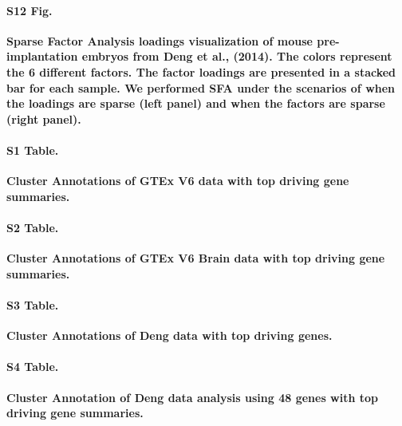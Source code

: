 \documentclass[10pt,letterpaper]{article}
\begin{document}
\paragraph*{S12 Fig.}
\label{figS12}
\bf{Sparse Factor Analysis loadings visualization of mouse pre-implantation
embryos from Deng et al., (2014). The colors represent the 6 different factors. The factor loadings are presented in a stacked bar for each sample. We performed SFA under the scenarios of when the loadings are sparse (left panel) and when the factors are sparse (right panel).}

\paragraph*{S1 Table.}
\label{supptab1}
{\bf Cluster Annotations of GTEx V6 data with top driving gene summaries.}

\paragraph*{S2 Table.}
\label{supptab2}
{\bf Cluster Annotations of GTEx V6 Brain data with top driving gene summaries.}

\paragraph*{S3 Table.}
\label{supptab3}
{\bf Cluster Annotations of Deng data with top driving genes.}

\paragraph*{S4 Table.}
\label{supptab3}
{\bf Cluster Annotation of Deng data analysis using 48 genes with top driving gene summaries.}


\end{document}
